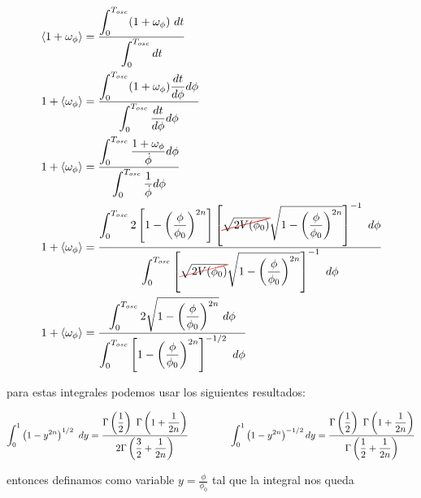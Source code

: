 \begin{equation*}
    \begin{split}
        \langle 1 + \omega_\phi \rangle &= \frac{\displaystyle \int_0^{T_{osc}} (1 + \omega_\phi) \ dt}{\displaystyle \int_0^{T_{osc}} dt}\\
        1 + \langle \omega_\phi \rangle &= \frac{\displaystyle \int_0^{T_{osc}} (1 + \omega_\phi) \frac{dt}{d\phi} d\phi}{\displaystyle \int_0^{T_{osc}} \frac{dt}{d\phi} d\phi}\\
        1 + \langle \omega_\phi \rangle &= \frac{\displaystyle \int_0^{T_{osc}} \frac{1 + \omega_\phi}{\dot{\phi}} d\phi}{\displaystyle \int_0^{T_{osc}} \frac{1}{\dot{\phi}} d\phi}\\
        1 + \langle \omega_\phi \rangle &= \frac{\displaystyle \int_0^{T_{osc}} 2 \left[ 1 - \left( \frac{\phi}{\phi_0} \right)^{2n} \right] \left[ \colorcancel{red}{\sqrt{2 V(\phi_0)}} \sqrt{1 - \left( \frac{\phi}{\phi_0} \right)^{2n}} \right]^{-1} \ d\phi}{\displaystyle \int_0^{T_{osc}} \left[ \colorcancel{red}{\sqrt{2 V(\phi_0)}} \sqrt{1 - \left( \frac{\phi}{\phi_0} \right)^{2n}} \right]^{-1} \ d\phi}\\
        1 + \langle \omega_\phi \rangle &= \frac{\displaystyle \int_0^{T_{osc}} 2 \sqrt{1 - \left( \frac{\phi}{\phi_0} \right)^{2n}} \ d\phi}{\displaystyle \int_0^{T_{osc}} \left[ 1 - \left( \frac{\phi}{\phi_0} \right)^{2n} \right]^{-1/2} \ d\phi}
    \end{split}
\end{equation*}

\noindent
para estas integrales podemos usar los siguientes resultados:

\begin{equation}
    \int_0^1 \left( 1 - y^{2n} \right)^{1/2} \ dy = \frac{\displaystyle \Gamma \left( \frac{1}{2} \right) \ \Gamma \left( 1 + \frac{1}{2n} \right)}{\displaystyle 2 \Gamma \left( \frac{3}{2} + \frac{1}{2n}  \right)} \hspace{1.5cm} \int_0^1 \left( 1 - y^{2n} \right)^{-1/2} dy = \frac{\displaystyle \Gamma \left( \frac{1}{2} \right) \ \Gamma \left( 1 + \frac{1}{2n} \right)}{\displaystyle \Gamma \left( \frac{1}{2} + \frac{1}{2n} \right)}
\end{equation}

\noindent
entonces definamos como variable $\displaystyle y = \frac{\phi}{\phi_0}$ tal que la integral nos queda

